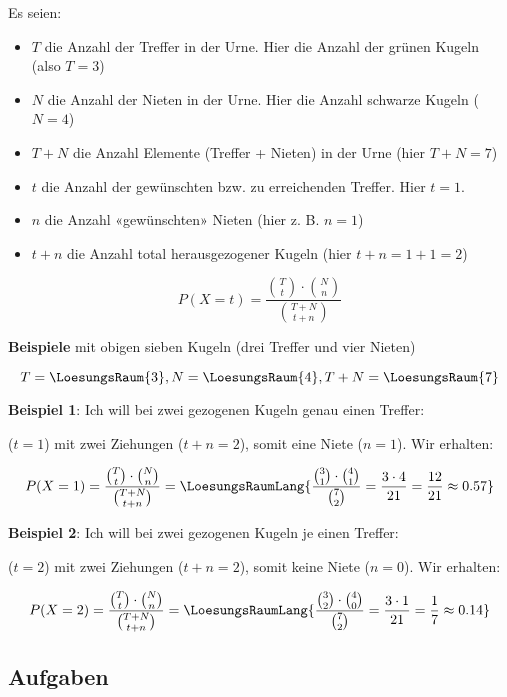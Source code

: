 Es seien:
\begin{itemize}
\item $T$ die Anzahl der Treffer in der Urne. Hier die Anzahl der grünen Kugeln (also $T = 3$)
\item $N$ die Anzahl der Nieten in der Urne. Hier die Anzahl schwarze Kugeln ($N=4$)
\item $T+N$ die Anzahl Elemente (Treffer + Nieten) in der Urne (hier $T+N = 7$)

\item $t$ die Anzahl der gewünschten bzw. zu erreichenden Treffer. Hier \zB $t=1$.
  
\item $n$ die Anzahl «gewünschten» Nieten (hier z. B. $n = 1$)
\item $t+n$ die Anzahl total herausgezogener Kugeln (hier $t+n=1+1=2$)
\end{itemize}

\newpage


\begin{gesetz}{}{}
$$P(X=t) = \frac{ {T\choose t} \cdot{} {{N}\choose {n}}}{{{T+N} \choose {t+n}}}$$
\end{gesetz}

\textbf{Beispiele} mit obigen sieben Kugeln (drei Treffer und vier
Nieten)
\leserluft

$$T=\LoesungsRaum{3}, N=\LoesungsRaum{4}, T+N=\LoesungsRaum{7}$$


\textbf{Beispiel 1}: Ich will bei zwei gezogenen Kugeln genau einen Treffer:

($t=1$) mit zwei Ziehungen ($t+n=2$), somit eine Niete ($n=1$).
Wir erhalten:

$$P(X=1) = \frac{ {T\choose t} \cdot{} {{N}\choose {n}}}{{{T+N}
    \choose {t+n}}} = \LoesungsRaumLang{\frac{ {3\choose 1} \cdot{} {{4}\choose {1}}}{{7
    \choose 2}} = \frac{3\cdot{4}}{21} = \frac{12}{21} \approx 0.57}$$

\textbf{Beispiel 2}: Ich will bei zwei gezogenen Kugeln je einen Treffer:

($t=2$) mit zwei Ziehungen ($t+n=2$), somit keine Niete ($n=0$).
Wir erhalten:

$$P(X=2) = \frac{ {T\choose t} \cdot{} {{N}\choose {n}}}{{{T+N}
    \choose {t+n}}} = \LoesungsRaumLang{\frac{ {3\choose 2} \cdot{} {{4}\choose {0}}}{{7
    \choose 2}} = \frac{3\cdot{}1}{21} = \frac17 \approx 0.14}$$


\subsection*{Aufgaben}

\newpage

